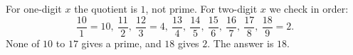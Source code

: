 For one-digit $x$ the quotient is $1$, not prime. For two-digit $x$ we check in order:
\[
\dfrac{10}{1}=10,\ \dfrac{11}{2},\ \dfrac{12}{3}=4,\ \dfrac{13}{4},\ \dfrac{14}{5},\ \dfrac{15}{6},\ \dfrac{16}{7},\ \dfrac{17}{8},\ \dfrac{18}{9}=2 .
\]
None of $10$ to $17$ gives a prime, and $18$ gives $2$. The answer is $\boxed{18}$.
